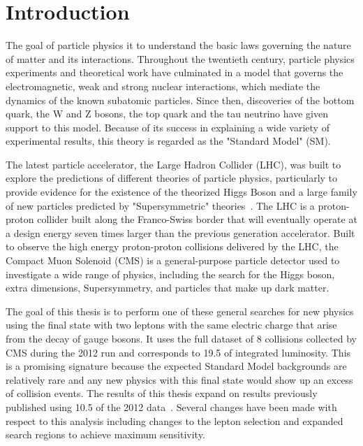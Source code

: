 \chapter{Introduction}
\label{ch:intro}

The goal of particle physics it to understand the basic laws governing the
nature of matter and its interactions. Throughout the twentieth century,
particle physics experiments and theoretical work have culminated in a model
that governs the electromagnetic, weak and strong nuclear interactions, which
mediate the dynamics of the known subatomic particles. Since then, discoveries
of the bottom quark, the W and Z bosons, the top quark and the tau neutrino
have given support to this model. Because of its success in explaining a wide
variety of experimental results, this theory is regarded as the "Standard
Model" (SM).

The latest particle accelerator, the Large Hadron Collider (LHC), was built to
explore the predictions of different theories of particle physics, particularly
to provide evidence for the existence of the theorized Higgs Boson and a large
family of new particles predicted by "Supersymmetric" theories~\cite{lhcgoal}.
The LHC is a proton-proton collider built along the Franco-Swiss border
that will eventually operate at a design energy seven times larger than the
previous generation accelerator. Built to observe the high energy proton-proton
collisions delivered by the LHC, the Compact Muon Solenoid (CMS) is a
general-purpose particle detector used to investigate a wide range of physics,
including the search for the Higgs boson, extra dimensions, Supersymmetry, and
particles that make up dark matter.

The goal of this thesis is to perform one of these general searches for new
physics using the final state with two leptons with the same electric charge
that arise from the decay of gauge bosons. It uses the full dataset of 8 \TeV
collisions collected by CMS during the 2012 run and corresponds to 19.5 \fbinv
of integrated luminosity. This is a promising signature because the expected
Standard Model backgrounds are relatively rare and any new physics with this
final state would show up an excess of collision events. The results of this
thesis expand on results previously published using 10.5 \fbinv of the 2012
data~\cite{sspaper2012}. Several changes have been made with respect to this
analysis including changes to the lepton selection and expanded search regions
to achieve maximum sensitivity.


